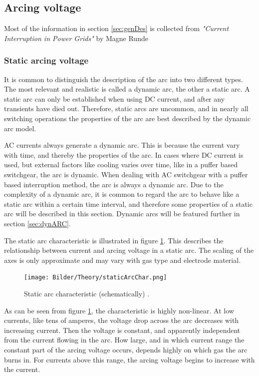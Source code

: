\documentclass[10pt,b5paper,twoside]{article}
\begin{document}
\newpage
\subsection{Arcing voltage}
Most of the information in section \ref{sec:genDes} is collected from \textit{"Current Interruption in Power Grids"} by Magne Runde \cite{bib:HVEbreak} \newline

\subsubsection{Static arcing voltage} \label{sec:staticArcVoltage}
It is common to distinguish the description of the arc into two different types. The most relevant and realistic is called a dynamic arc, the other a static arc. A static arc can only be established when using DC current, and after any transients have died out. Therefore, static arcs are uncommon, and in nearly all switching operations the properties of the arc are best described by the dynamic arc model.

AC currents always generate a dynamic arc. This is because the current vary with time, and thereby the properties of the arc. In cases where DC current is used, but external factors like cooling varies over time, like in a puffer based switchgear, the arc is dynamic. When dealing with AC switchgear with a puffer based interruption method, the arc is always a dynamic arc. Due to the complexity of a dynamic arc, it is common to regard the arc to behave like a static arc within a certain time interval, and therefore some properties of a static arc will be described in this section. Dynamic arcs will be featured further in section \ref{sec:dynARC}.

The static arc characteristic is illustrated in figure \ref{fig:staticArcChar}. This describes the relationship between current and arcing voltage in a static arc. The scaling of the axes is only approximate and may vary with gas type and electrode material.

\begin{figure}[H]
\centering
\texttt{[image: Bilder/Theory/staticArcChar.png]}
\caption{Static arc characteristic (schematically) \cite{bib:HVEbreak}.} \label{fig:staticArcChar}
\end{figure}

As can be seen from figure \ref{fig:staticArcChar}, the characteristic is highly non-linear. At low currents, like tens of amperes, the voltage drop across the arc decreases with increasing current. Then the voltage is constant, and apparently independent from the current flowing in the arc. How large, and in which current range the constant part of the arcing voltage occurs, depends highly on which gas the arc burns in. For currents above this range, the arcing voltage begins to increase with the current.
\end{document}
